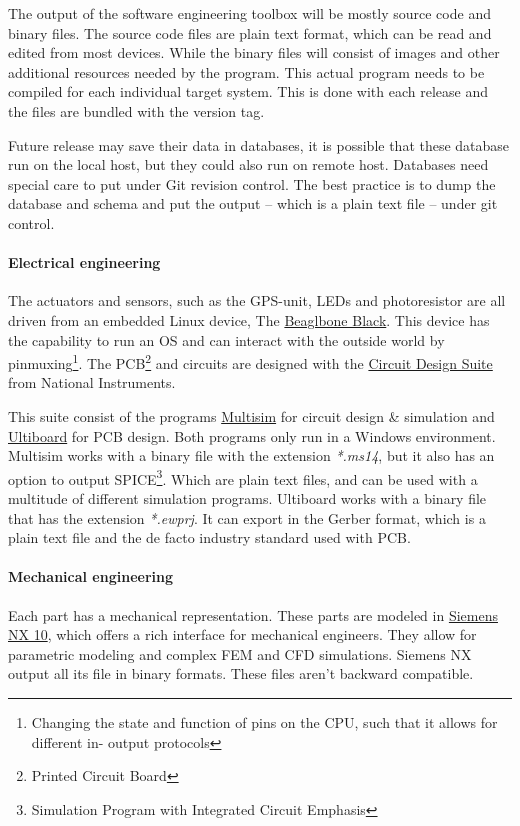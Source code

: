 \documentclass[fleqn,10pt]{SelfArx} %
\begin{document}
The output of the software engineering toolbox will be mostly source code and binary files. The source code files are plain text format, which can be read and edited from most devices. While the binary files will consist of images and other additional resources needed by the program. This actual program needs to be compiled for each individual target system. This is done with each release and the files are bundled with the version tag.

Future release may save their data in databases, it is possible that these database run on the local host, but they could also run on remote host. Databases need special care to put under Git revision control. The best practice is to dump the database and schema and put the output -- which is a plain text file -- under git control.
	
\paragraph{Electrical engineering}
The actuators and sensors, such as the GPS-unit, LEDs and photoresistor are all driven from an embedded Linux device, The \href{http://beagleboard.org/BLACK}{\color{color1}Beaglbone Black}. This device has the capability to run an OS and can interact with the outside world by pinmuxing\footnote{Changing the state and function of pins on the CPU, such that it allows for different in- output protocols}. The PCB\footnote{Printed Circuit Board} and circuits are designed with the \href{http://sine.ni.com/nips/cds/view/p/lang/nl/nid/204744}{\color{color1}Circuit Design Suite} from National Instruments.

This suite consist of the programs \href{http://www.ni.com/multisim/}{\color{color1}Multisim} for circuit design \& simulation and \href{http://www.ni.com/ultiboard/}{\color{color1}Ultiboard} for PCB design. Both programs only run in a Windows environment. Multisim works with a binary file with the extension \textit{*.ms14}, but it also has an option to output SPICE\footnote{Simulation Program with Integrated Circuit Emphasis}. Which are plain text files, and can be used with a multitude of different simulation programs. Ultiboard works with a binary file that has the extension \textit{*.ewprj}. It can export in the Gerber format, which is a plain text file and the de facto industry standard used with PCB.

\paragraph{Mechanical engineering}
Each part has a mechanical representation. These parts are modeled in \href{http://www.plm.automation.siemens.com/nl_nl/products/nx/}{\color{color1}Siemens NX 10}, which offers a rich interface for mechanical engineers. They allow for parametric modeling and complex FEM and CFD simulations. Siemens NX output all its file in binary formats. These files aren't backward compatible.
\end{document}
